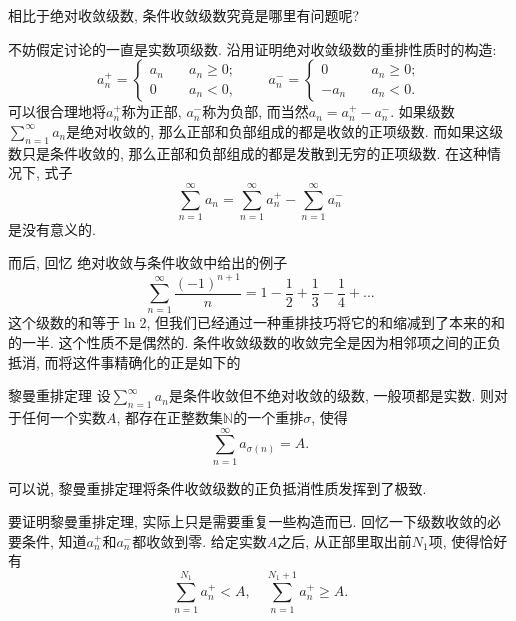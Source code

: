 

相比于绝对收敛级数, 条件收敛级数究竟是哪里有问题呢? 

不妨假定讨论的一直是实数项级数. 沿用证明绝对收敛级数的重排性质时的构造: 
$$
a_n^+=\left\{\begin{array}{cc}
{a_n}\quad &a_n\geq0;\\
0\quad &a_n<0,
\end{array}\right.
\quad\quad
a_n^-=\left\{\begin{array}{cc}
0\quad &a_n\geq0;\\
-a_n\quad &a_n<0.
\end{array}\right.
$$
可以很合理地将$a_n^+$称为正部, $a_n^-$称为负部, 而当然$a_n=a_n^+-a_n^-$. 如果级数$\sum_{n=1}^\infty a_n$是绝对收敛的, 那么正部和负部组成的都是收敛的正项级数. 而如果这级数只是条件收敛的, 那么正部和负部组成的都是发散到无穷的正项级数. 在这种情况下, 式子
$$
\sum_{n=1}^\infty a_n=\sum_{n=1}^\infty a_n^+-\sum_{n=1}^\infty a_n^-
$$
是没有意义的.

而后, 回忆 绝对收敛与条件收敛中给出的例子
$$
\sum_{n=1}^\infty\frac{(-1)^{n+1}}{n}
=1-\frac{1}{2}+\frac{1}{3}-\frac{1}{4}+...
$$
这个级数的和等于$\ln2$, 但我们已经通过一种重排技巧将它的和缩减到了本来的和的一半. 这个性质不是偶然的. 条件收敛级数的收敛完全是因为相邻项之间的正负抵消, 而将这件事精确化的正是如下的

\begin{theorem}{黎曼重排定理}
设$\sum_{n=1}^\infty a_n$是条件收敛但不绝对收敛的级数, 一般项都是实数. 则对于任何一个实数$A$, 都存在正整数集$\mathbb{N}$的一个重排$\sigma$, 使得
$$
\sum_{n=1}^\infty a_{\sigma(n)}=A.
$$
\end{theorem}

可以说, 黎曼重排定理将条件收敛级数的正负抵消性质发挥到了极致.

要证明黎曼重排定理, 实际上只是需要重复一些构造而已. 回忆一下级数收敛的必要条件, 知道$a_n^+$和$a_n^-$都收敛到零. 给定实数$A$之后, 从正部里取出前$N_1$项, 使得恰好有
\[
\sum_{n=1}^{N_1}a_n^+<A,
\quad
\sum_{n=1}^{N_1+1}a_n^+\geq A.
\]